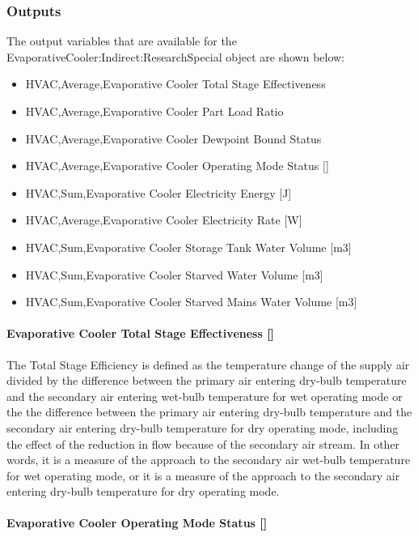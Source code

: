 \subsubsection{Outputs}\label{outputs-4-004}

The output variables that are available for the EvaporativeCooler:Indirect:ResearchSpecial object are shown below:

\begin{itemize}
\item
  HVAC,Average,Evaporative Cooler Total Stage Effectiveness
\item
  HVAC,Average,Evaporative Cooler Part Load Ratio
\item
  HVAC,Average,Evaporative Cooler Dewpoint Bound Status
\item
  HVAC,Average,Evaporative Cooler Operating Mode Status {[]}
\item
  HVAC,Sum,Evaporative Cooler Electricity Energy {[}J{]}
\item
  HVAC,Average,Evaporative Cooler Electricity Rate {[}W{]}
\item
  HVAC,Sum,Evaporative Cooler Storage Tank Water Volume {[}m3{]}
\item
  HVAC,Sum,Evaporative Cooler Starved Water Volume {[}m3{]}
\item
  HVAC,Sum,Evaporative Cooler Starved Mains Water Volume {[}m3{]}
\end{itemize}

\paragraph{Evaporative Cooler Total Stage Effectiveness {[]}}\label{evaporative-cooler-total-stage-effectiveness-2}

The Total Stage Efficiency is defined as the temperature change of the supply air divided by the difference between the primary air entering dry-bulb temperature and the secondary air entering wet-bulb temperature for wet operating mode or the the difference between the primary air entering dry-bulb temperature and the secondary air entering dry-bulb temperature for dry operating mode, including the effect of the reduction in flow because of the secondary air stream. In other words, it is a measure of the approach to the secondary air wet-bulb temperature for wet operating mode, or it is a measure of the approach to the secondary air entering dry-bulb temperature for dry operating mode.

\paragraph{Evaporative Cooler Operating Mode Status {[]}}\label{evaporative-cooler-operating-mode-status}

